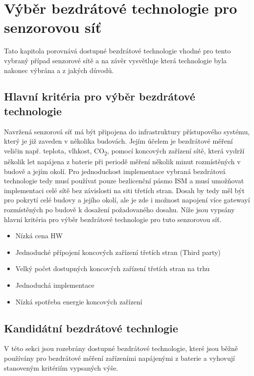 \chapter{Výběr bezdrátové technologie pro senzorovou síť}
Tato kapitola porovnává dostupné bezdrátové technologie vhodné pro tento vybraný případ senzorové sítě a na závěr vysvětluje která technologie byla nakonec výbrána a z jakých důvodů.


\section{Hlavní kritéria pro výběr bezdrátové technologie}
Navržená senzorová síť má být připojena do infrastruktury přístupového systému, který je již zaveden v několika budovách. Jejím účelem je bezdrátové měření veličin např. teplota, vlhkost, CO\textsubscript{2}, pomocí koncových zařízení sítě, která vydrží několik let napájena z baterie při periodě měření několik minut rozmístěných v budově a jejím okolí.
Pro jednoduchost implementace vybraná bezdrátová technologie tedy musí používat pouze bezlicenční pásmo ISM a musí umožňovat implementaci celé sítě bez závislosti na siti třetích stran. 
Dosah by tedy měl být pro pokrytí celé budovy a jejího okolí, ale je zde i možnost napojení více gatewayí rozmístěných po budově k dosažení požadovaného dosahu.
Níže jsou vypsány hlavní kritéria pro výběr bezdrátové technologie pro tuto senzorovou síť.

\begin{itemize}
  \item Nízká cena HW
  \item Jednoduché přípojení koncových zařízení třetích stran (Third party)
  \item Velký počet dostupných koncových zařízení třetích stran na trhu 
  \item Jednoduchá implementace
  \item Nízká spotřeba energie koncových zařízení
\end{itemize}

\section{Kandidátní bezdrátové technlogie}
V této sekci jsou rozebrány dostupné bezdrátové technologie, které jsou běžně používány pro bezdrátové měření zařízeními napájenými z baterie a vyhovují stanoveným kritériím vypsaných výše.

